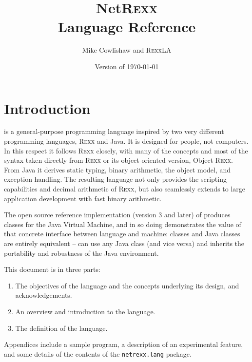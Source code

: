 

\renewcommand{\isbn}{978-94-648-5133-5}
\setcounter{tocdepth}{1}
\title{NetR\textsc{exx}\protect{}\\Language Reference}
\author{Mike Cowlishaw and R\textsc{exx}LA}
\date{\null\hfill Version  of \today}
\maketitle
{}
\pagestyle{plain}
\frontmatter
{}
\pagestyle{plain}


\tableofcontents
\pagestyle{fancy}
\newpage
{}
\frontmatter
\large

%
\mainmatter
\chapter{Introduction}
\nr{} is a general-purpose programming language inspired by two very
different programming languages, R\textsc{exx}\textsuperscript{\texttrademark} and Java\textsuperscript{\texttrademark}. It is designed for
people, not computers. In this respect it follows R\textsc{exx} closely, with
many of the concepts and most of the syntax taken directly from R\textsc{exx}
or its object-oriented version, Object R\textsc{exx}. From Java it derives
static typing, binary arithmetic, the object model, and exception
handling. The resulting language not only provides the scripting
capabilities and decimal arithmetic of R\textsc{exx}, but also seamlessly
extends to large application development with fast binary arithmetic.

The open source reference implementation (version 3 and later) of
\nr{} produces classes for the Java Virtual Machine, and in so doing
demonstrates the value of that concrete interface between language and
machine: \nr{} classes and Java classes are entirely equivalent –
\nr{} can use any Java class (and vice versa) and inherits the
portability and robustness of the Java environment.

This document is in three parts:
\begin{enumerate}
\item The objectives of the \nr{} language and the concepts underlying its design, and acknowledgements.
\item An overview and introduction to the \nr{} language.
\item The definition of the language.
\end{enumerate}
Appendices include a sample \nr{} program, a description of an experimental feature, and some
details of the contents of the \texttt{netrexx.lang} package.

